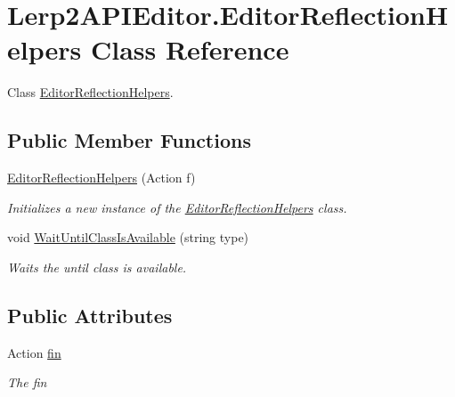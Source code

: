 \hypertarget{class_lerp2_a_p_i_editor_1_1_editor_reflection_helpers}{}\section{Lerp2\+A\+P\+I\+Editor.\+Editor\+Reflection\+Helpers Class Reference}
\label{class_lerp2_a_p_i_editor_1_1_editor_reflection_helpers}


Class \hyperlink{class_lerp2_a_p_i_editor_1_1_editor_reflection_helpers}{Editor\+Reflection\+Helpers}.  


\subsection*{Public Member Functions}
\begin{DoxyCompactItemize}
\item 
\hyperlink{class_lerp2_a_p_i_editor_1_1_editor_reflection_helpers_a7510cf6dfb74d26787c51c52d1726224}{Editor\+Reflection\+Helpers} (Action f)
\begin{DoxyCompactList}\small\item\em Initializes a new instance of the \hyperlink{class_lerp2_a_p_i_editor_1_1_editor_reflection_helpers}{Editor\+Reflection\+Helpers} class. \end{DoxyCompactList}\item 
void \hyperlink{class_lerp2_a_p_i_editor_1_1_editor_reflection_helpers_a6b4b4c039fdf60d1320c93bc1bfa4b7b}{Wait\+Until\+Class\+Is\+Available} (string type)
\begin{DoxyCompactList}\small\item\em Waits the until class is available. \end{DoxyCompactList}\end{DoxyCompactItemize}
\subsection*{Public Attributes}
\begin{DoxyCompactItemize}
\item 
Action \hyperlink{class_lerp2_a_p_i_editor_1_1_editor_reflection_helpers_ae242808119aa1d686b7864e255e44b4f}{fin}
\begin{DoxyCompactList}\small\item\em The fin \end{DoxyCompactList}\end{DoxyCompactItemize}



